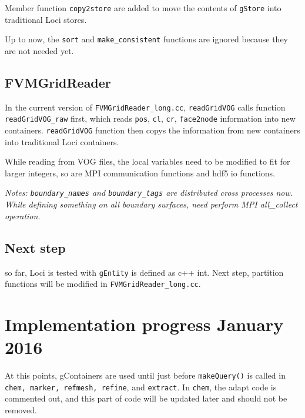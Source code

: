 \documentclass{article}
\begin{document}
Member function \texttt{copy2store}  are added to move the
contents of \texttt{gStore} into traditional Loci stores. 

Up to now, the \texttt{sort} and \texttt{make\_consistent} functions are ignored because
they are not needed yet.  

 
\subsection{FVMGridReader}  
  In the current version of \texttt{FVMGridReader\_long.cc}, \texttt{readGridVOG} calls function \texttt{readGridVOG\_raw}
  first,  which reads \texttt{pos}, \texttt{cl}, \texttt{cr}, \texttt{face2node} information into new
  containers. \texttt{readGridVOG} function then  copys the information from new
  containers into traditional Loci containers.

  While reading from VOG files, the local variables need to be modified
  to fit for larger integers, so are MPI communication functions and hdf5 io
  functions. 


   {\it Notes: \texttt{boundary\_names} and \texttt{boundary\_tags} are distributed
     cross processes now. While defining something on all boundary
     surfaces, need perform MPI all\_collect operation. }


\subsection{Next step}        
 so far, Loci is tested with \texttt{gEntity} is defined as c++ int. Next step,
 partition functions will be modified in \texttt{FVMGridReader\_long.cc}.

\section{Implementation progress January 2016}
At this points, gContainers are used until just before \texttt{makeQuery()} is
called in \texttt{chem, marker, refmesh, refine}, and \texttt{extract}. In \texttt{chem}, the
adapt code is commented out, and this part of code will be updated
later and should not be removed. 
\end{document}
